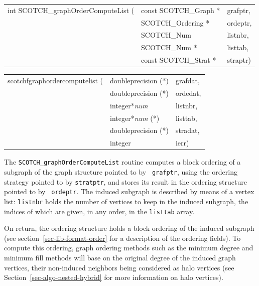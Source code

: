 \begin{itemize}
\progsyn

{\tt\begin{tabular}{l@{}ll}
int SCOTCH\_graphOrderComputeList ( & const SCOTCH\_Graph * & grafptr, \\
                                    & SCOTCH\_Ordering *    & ordeptr, \\
                                    & SCOTCH\_Num           & listnbr, \\
                                    & SCOTCH\_Num *         & listtab, \\
                                    & const SCOTCH\_Strat * & straptr)
\end{tabular}}

{\tt\begin{tabular}{l@{}ll}
scotchfgraphordercomputelist ( & doubleprecision (*)   & grafdat, \\
                               & doubleprecision (*)   & ordedat, \\
                               & integer*{\it num}     & listnbr, \\
                               & integer*{\it num} (*) & listtab, \\
                               & doubleprecision (*)   & stradat, \\
                               & integer               & ierr)
\end{tabular}}

\progdes

The {\tt SCOTCH\_graphOrderComputeList} routine computes a block
ordering of a subgraph of the graph structure pointed to by {\tt
grafptr}, using the ordering strategy pointed to by {\tt stratptr},
and stores its result in the ordering structure pointed to by {\tt
ordeptr}. The induced subgraph is described by means of a vertex
list: {\tt listnbr} holds the number of vertices to keep in the
induced subgraph, the indices of which are given, in any order,
in the {\tt listtab} array.

On return, the ordering structure holds a block ordering of the
induced subgraph (see section~\ref{sec-lib-format-order} for a
description of the ordering fields). To compute this ordering, graph
ordering methods such as the minimum degree and minimum fill methods
will base on the original degree of the induced graph vertices, their
non-induced neighbors being considered as halo vertices (see
Section~\ref{sec-algo-nested-hybrid} for more information on halo
vertices).


\end{itemize}
